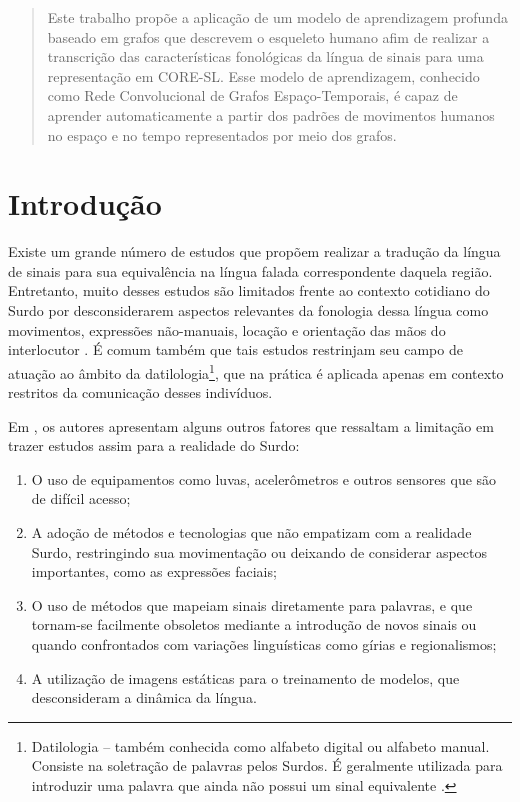 

\maketitle
\begin{abstract}
Este trabalho propõe a aplicação de um modelo de aprendizagem profunda baseado em grafos que descrevem o esqueleto humano afim de realizar a transcrição das características fonológicas da língua de sinais para uma representação em CORE-SL. Esse modelo de aprendizagem, conhecido como Rede Convolucional de Grafos Espaço-Temporais, é capaz de aprender automaticamente a partir dos padrões de movimentos humanos no espaço e no tempo representados por meio dos grafos.
\end{abstract}



\section{Introdução} %
\label{sec:introducao}
Existe um grande número de estudos que propõem realizar a tradução da língua de sinais para sua equivalência na língua falada correspondente daquela região. Entretanto, muito desses estudos são limitados frente ao contexto cotidiano do Surdo por desconsiderarem aspectos relevantes da fonologia dessa língua como movimentos, expressões não-manuais, locação e orientação das mãos do interlocutor \cite{quadros-2004}. É comum também que tais estudos restrinjam seu campo de atuação ao âmbito da datilologia\footnote{
    Datilologia – também conhecida como alfabeto digital ou alfabeto manual. Consiste na soletração de palavras pelos Surdos. É geralmente utilizada para introduzir uma palavra que ainda não possui um sinal equivalente \cite{quadros-2004}\cite{pereira-choi-2011}.
}, que na prática é aplicada apenas em contexto restritos da comunicação desses indivíduos.

Em \cite{antunes-hcisl-2011}, os autores apresentam alguns outros fatores que ressaltam a limitação em trazer estudos assim para a realidade do Surdo: 
\begin{enumerate}
    \item O uso de equipamentos como luvas, acelerômetros e outros sensores que são de difícil acesso; 
    \item A adoção de métodos e tecnologias que não empatizam com a realidade Surdo, restringindo sua movimentação ou deixando de considerar aspectos importantes, como as expressões faciais;
    \item O uso de métodos que mapeiam sinais diretamente para palavras, e que tornam-se facilmente obsoletos mediante a introdução de novos sinais ou quando confrontados com variações linguísticas como gírias e regionalismos; 
    \item A utilização de imagens estáticas para o treinamento de modelos, que desconsideram a dinâmica da língua.
\end{enumerate}

